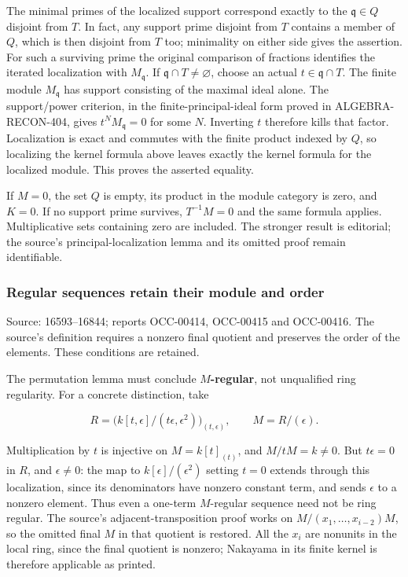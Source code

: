 The minimal primes of the localized support correspond exactly to the \(\mathfrak q\in Q\) disjoint from \(T\). In fact, any support prime disjoint from \(T\) contains a member of \(Q\), which is then disjoint from \(T\) too; minimality on either side gives the assertion. For such a surviving prime the original comparison of fractions identifies the iterated localization with \(M_{\mathfrak q}\). If \(\mathfrak q\cap T\ne\varnothing\), choose an actual \(t\in\mathfrak q\cap T\). The finite module \(M_{\mathfrak q}\) has support consisting of the maximal ideal alone. The support/power criterion, in the finite-principal-ideal form proved in ALGEBRA-RECON-404, gives \(t^N M_{\mathfrak q}=0\) for some \(N\). Inverting \(t\) therefore kills that factor. Localization is exact and commutes with the finite product indexed by \(Q\), so localizing the kernel formula above leaves exactly the kernel formula for the localized module. This proves the asserted equality.

If \(M=0\), the set \(Q\) is empty, its product in the module category is zero, and \(K=0\). If no support prime survives, \(T^{-1}M=0\) and the same formula applies. Multiplicative sets containing zero are included. The stronger result is editorial; the source's principal-localization lemma and its omitted proof remain identifiable.

\subsubsection{Regular sequences retain their module and order}\label{algebra-proof-006-regular-sequences-retain-their-module-and-order}

Source: 16593--16844; reports OCC-00414, OCC-00415 and OCC-00416. The source's definition requires a nonzero final quotient and preserves the order of the elements. These conditions are retained.

The permutation lemma must conclude \textbf{\(M\)-regular}, not unqualified ring regularity. For a concrete distinction, take

\[
R=\bigl(k[t,\epsilon]/(t\epsilon,\epsilon^2)\bigr)_{(t,\epsilon)},
\qquad M=R/(\epsilon).
\]

Multiplication by \(t\) is injective on \(M=k[t]_{(t)}\), and \(M/tM=k\ne0\). But \(t\epsilon=0\) in \(R\), and \(\epsilon\ne0\): the map to \(k[\epsilon]/(\epsilon^2)\) setting \(t=0\) extends through this localization, since its denominators have nonzero constant term, and sends \(\epsilon\) to a nonzero element. Thus even a one-term \(M\)-regular sequence need not be ring regular. The source's adjacent-transposition proof works on \(M/(x_1,\ldots,x_{i-2})M\), so the omitted final \(M\) in that quotient is restored. All the \(x_i\) are nonunits in the local ring, since the final quotient is nonzero; Nakayama in its finite kernel is therefore applicable as printed.

